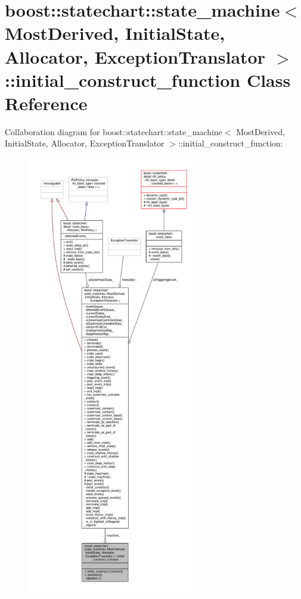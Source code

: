 \hypertarget{classboost_1_1statechart_1_1state__machine_1_1initial__construct__function}{}\section{boost\+:\+:statechart\+:\+:state\+\_\+machine$<$ Most\+Derived, Initial\+State, Allocator, Exception\+Translator $>$\+:\+:initial\+\_\+construct\+\_\+function Class Reference}
\label{classboost_1_1statechart_1_1state__machine_1_1initial__construct__function}


Collaboration diagram for boost\+:\+:statechart\+:\+:state\+\_\+machine$<$ Most\+Derived, Initial\+State, Allocator, Exception\+Translator $>$\+:\+:initial\+\_\+construct\+\_\+function\+:
\nopagebreak
\begin{figure}[H]
\begin{center}
\leavevmode
\includegraphics[height=550pt]{classboost_1_1statechart_1_1state__machine_1_1initial__construct__function__coll__graph}
\end{center}
\end{figure}
